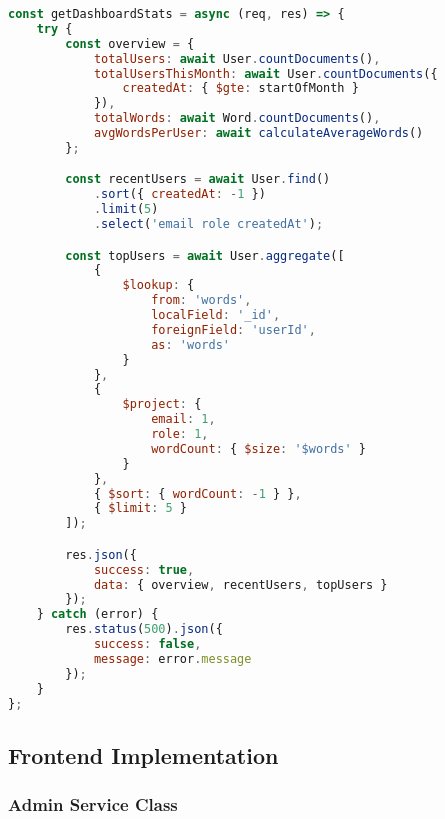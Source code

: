 \documentclass[12pt,a4paper]{article}
\begin{document}
\begin{lstlisting}[language=JavaScript, caption=Dashboard Stats Implementation]
const getDashboardStats = async (req, res) => {
    try {
        const overview = {
            totalUsers: await User.countDocuments(),
            totalUsersThisMonth: await User.countDocuments({
                createdAt: { $gte: startOfMonth }
            }),
            totalWords: await Word.countDocuments(),
            avgWordsPerUser: await calculateAverageWords()
        };

        const recentUsers = await User.find()
            .sort({ createdAt: -1 })
            .limit(5)
            .select('email role createdAt');

        const topUsers = await User.aggregate([
            {
                $lookup: {
                    from: 'words',
                    localField: '_id',
                    foreignField: 'userId',
                    as: 'words'
                }
            },
            {
                $project: {
                    email: 1,
                    role: 1,
                    wordCount: { $size: '$words' }
                }
            },
            { $sort: { wordCount: -1 } },
            { $limit: 5 }
        ]);

        res.json({
            success: true,
            data: { overview, recentUsers, topUsers }
        });
    } catch (error) {
        res.status(500).json({
            success: false,
            message: error.message
        });
    }
};
\end{lstlisting}

\subsection{Frontend Implementation}

\subsubsection{Admin Service Class}
\end{document}
